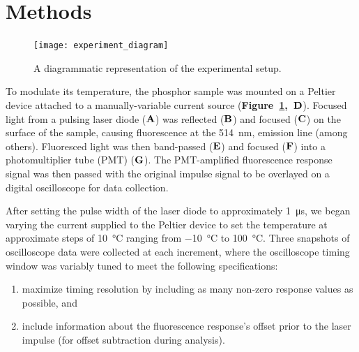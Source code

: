 \documentclass[12pt]{article}
\begin{document}
  \section*{Methods}{

  \begin{figure}[ht]
    \centering
    \texttt{[image: experiment\_diagram]}
    \caption{A diagrammatic representation of the experimental setup.}\label{fig:setup}
  \end{figure}

    To modulate its temperature, the phosphor sample was mounted on a Peltier device attached to a manually-variable current source (\textbf{Figure~\ref*{fig:setup},~\(\bf{D}\)}). Focused light from a pulsing laser diode (\(\bf{A}\)) was reflected (\(\bf{B}\)) and focused (\(\bf{C}\)) on the surface of the sample, causing fluorescence at the \SI{514}{\nm},  emission line (among others). Fluoresced light was then band-passed (\(\bf{E}\)) and focused (\(\bf{F}\)) into a photomultiplier tube (PMT) (\(\bf{G}\)). The PMT-amplified fluorescence response signal was then passed with the original impulse signal to be overlayed on a digital oscilloscope for data collection.
    
    After setting the pulse width of the laser diode to approximately \SI{1}{\micro\second}, we began varying the current supplied to the Peltier device to set the temperature at approximate steps of \SI{10}{\degreeCelsius} ranging from \SI{-10}{\degreeCelsius} to \SI{100}{\degreeCelsius}. Three snapshots of oscilloscope data were collected at each increment, where the oscilloscope timing window was variably tuned to meet the following specifications:
      
      \begin{enumerate}
        \item maximize timing resolution by including as many non-zero response values as possible, and
        \item include information about the fluorescence response's offset prior to the laser impulse (for offset subtraction during analysis).
      \end{enumerate}
  }
\end{document}
